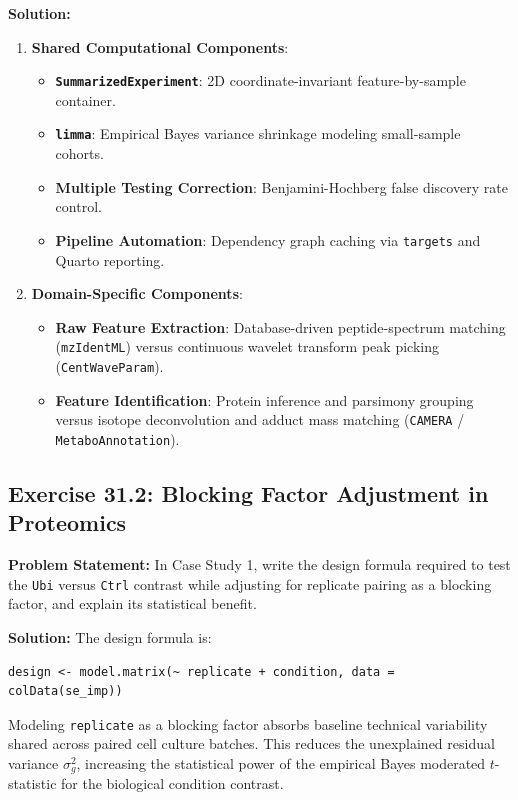 \documentclass[11pt,twoside,openright]{book}
\begin{document}
\noindent\textbf{Solution:}\enspace
\begin{enumerate}
\item \textbf{Shared Computational Components}:
\begin{itemize}
\item \textbf{\texttt{SummarizedExperiment}}: 2D coordinate-invariant feature-by-sample container.
\item \textbf{\texttt{limma}}: Empirical Bayes variance shrinkage modeling small-sample cohorts.
\item \textbf{Multiple Testing Correction}: Benjamini-Hochberg false discovery rate control.
\item \textbf{Pipeline Automation}: Dependency graph caching via \texttt{targets} and Quarto reporting.
\end{itemize}
\item \textbf{Domain-Specific Components}:
\begin{itemize}
\item \textbf{Raw Feature Extraction}: Database-driven peptide-spectrum matching (\texttt{mzIdentML}) versus continuous wavelet transform peak picking (\texttt{CentWaveParam}).
\item \textbf{Feature Identification}: Protein inference and parsimony grouping versus isotope deconvolution and adduct mass matching (\texttt{CAMERA} / \texttt{MetaboAnnotation}).
\end{itemize}
\end{enumerate}

\subsection*{Exercise 31.2: Blocking Factor Adjustment in Proteomics}
\noindent\textbf{Problem Statement:}\enspace
In Case Study 1, write the design formula required to test the \texttt{Ubi} versus \texttt{Ctrl} contrast while adjusting for replicate pairing as a blocking factor, and explain its statistical benefit.

\noindent\textbf{Solution:}\enspace
The design formula is:
\begin{verbatim}
design <- model.matrix(~ replicate + condition, data = colData(se_imp))
\end{verbatim}
Modeling \texttt{replicate} as a blocking factor absorbs baseline technical variability shared across paired cell culture batches. This reduces the unexplained residual variance $\sigma_g^2$, increasing the statistical power of the empirical Bayes moderated $t$-statistic for the biological condition contrast.
\end{document}
